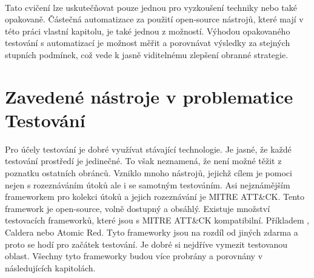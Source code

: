 \paragraph{}
Tato cvičení lze uskutečňovat pouze jednou pro vyzkoušení techniky nebo také opakovaně.
Částečná automatizace za použití open-source nástrojů, které mají v této práci vlastní kapitolu, je také jednou z možností.
Výhodou opakovaného testování s automatizací je možnost měřit a porovnávat výsledky za stejných stupních podmínek, což vede k jasně viditelnému zlepšení obranné strategie.\cite{securityInteligence_pen_test_red_team_purple_team,redscan_team_purple_team}

\section{Zavedené nástroje v problematice Testování}\label{sec:zavedene-nastroje-v-problematice-testovani}
Pro účely testování je dobré využívat stávající technologie.
Je jasné, že každé testování prostředí je jedinečné.
To však neznamená, že není možné těžit z poznatku ostatních obránců.
Vzniklo mnoho nástrojů, jejichž cílem je pomoci nejen s rozeznáváním útoků ale i se samotným testováním.
Asi nejznámějším frameworkem pro kolekci útoků a jejich rozeznávání je MITRE ATT\&CK\cite{mitre_attack_framework}.
Tento framework je open-source, volně dostupný a obsáhlý.
Existuje množství testovacích frameworků, které jsou s MITRE ATT\&CK kompatibilní\cite{csoonline_4_testing_frameworks}.
Příkladem , Caldera nebo Atomic Red.
Tyto frameworky jsou na rozdíl od jiných zdarma a proto se hodí pro začátek testování.
Je dobré si nejdříve vymezit testovanou oblast.
Všechny tyto frameworky budou více probrány a porovnány v následujících kapitolách.

